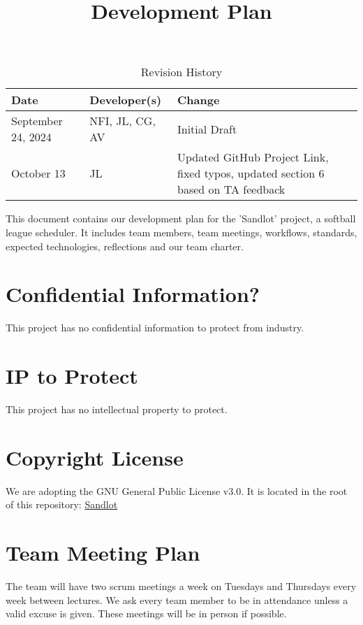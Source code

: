 \documentclass{article}
\title{Development Plan\\\progname}
\author{\authname}
\date{}
\begin{document}
\maketitle

\begin{table}[hp]
\caption{Revision History} \label{TblRevisionHistory}
\begin{tabularx}{\textwidth}{llX}
\toprule
\textbf{Date} & \textbf{Developer(s)} & \textbf{Change}\\
\midrule
September 24, 2024 & NFI, JL, CG, AV & Initial Draft\\
October 13 & JL & Updated GitHub Project Link, fixed typos, updated section 6 based on TA feedback\\
\bottomrule
\end{tabularx}
\end{table}

\newpage{}

This document contains our development plan for the 'Sandlot' project, a
softball league scheduler. It includes team members, team meetings, workflows,
standards, expected technologies, reflections and our team charter.

\section{Confidential Information?}

This project has no confidential information to protect from industry.

\section{IP to Protect}

This project has no intellectual property to protect.

\section{Copyright License}

We are adopting the GNU General Public License v3.0. It is located 
in the root of this repository: \href{https://github.com/Nicholas-Fabugais-Inaba/Sandlot/blob/main/LICENSE}{Sandlot}

\section{Team Meeting Plan}

The team will have two scrum meetings a week on Tuesdays and Thursdays every week
between lectures. We ask every team member to be in attendance unless a valid
excuse is given. These meetings will be in person if possible.\newline
\end{document}
